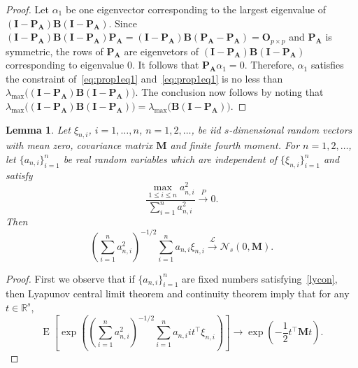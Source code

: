 \documentclass[12pt]{article} %
\DeclareMathOperator{\myE}{E}
\newcommand{\bM}{\mathbf{M}}
\newcommand{\bA}{\mathbf{A}}
\newcommand{\bB}{\mathbf{B}}
\newcommand{\bP}{\mathbf{P}}
\newcommand{\bO}{\mathbf{O}}
\newcommand{\bI}{\mathbf{I}}
\newtheorem{lemma}{Lemma}
\theoremstyle{definition}
\begin{document}
\begin{appendices}
\begin{proof}
    Let $\alpha_1$ be one eigenvector corresponding to the largest eigenvalue of $(\bI-\bP_\bA)\bB(\bI-\bP_\bA)$.
    Since $(\bI-\bP_\bA)\bB(\bI-\bP_\bA)\bP_\bA=(\bI-\bP_\bA)\bB(\bP_\bA-\bP_\bA)=\bO_{p\times p}$ and $\bP_\bA$ is symmetric, the rows of $\bP_\bA$ are eigenvetors of $(\bI-\bP_\bA)\bB(\bI-\bP_\bA)$ corresponding to eigenvalue $0$.
    It follows that $\bP_\bA\alpha_1=0$.
    Therefore, $\alpha_1$ satisfies the constraint of~\eqref{eq:prop1eq1} and~\eqref{eq:prop1eq1} is no less than $\lambda_{\max}\big((\bI-\bP_\bA)\bB(\bI-\bP_\bA)\big)$.
    The conclusion now follows by noting that $\lambda_{\max}\big((\bI-\bP_\bA)\bB(\bI-\bP_\bA)\big)=\lambda_{\max}\big( \bB(\bI-\bP_\bA)\big)$.
    
\end{proof}

\begin{lemma}
    Let $\xi_{n,i}$, $i=1,\ldots, n$, $n=1,2,\ldots$, be iid $s$-dimensional random vectors with mean zero, covariance matrix $\bM$ and finite fourth moment.
    For $n=1,2,\ldots$, let $\{a_{n,i}\}_{i=1}^n$ be real random variables which are independent of $\{\xi_{n,i}\}_{i=1}^n$ and satisfy 
    \begin{equation}\label{lycon}
        \frac{\max_{1\leq i\leq n}a_{n,i}^2}{\sum_{i=1}^n a_{n,i}^2}\xrightarrow{P}0.
    \end{equation}
    Then
    \begin{equation*}
    (\sum_{i=1}^n a_{n,i}^2)^{-1/2}\sum_{i=1}^n a_{n,i}\xi_{n,i} 
    \xrightarrow{\mathcal{L}}\mathcal{N}_s(0,\bM).
    \end{equation*}
    \label{CLTLEMMA}
\end{lemma}
\begin{proof}
    First we observe that if $\{a_{n,i}\}_{i=1}^n$ are fixed numbers satisfying~\eqref{lycon}, then Lyapunov central limit theorem and continuity theorem imply that 
    for any $t\in\mathbb{R}^s$,
    \begin{equation*}
        \myE\left[\exp\left(
    (\sum_{i=1}^n a_{n,i}^2)^{-1/2}\sum_{i=1}^n a_{n,i}it^\top \xi_{n,i} 
    \right)\right]
    \to
    \exp\left(-\frac{1}{2} t^\top \bM t\right).
    \end{equation*}


\end{proof}
\end{appendices}
\end{document}

